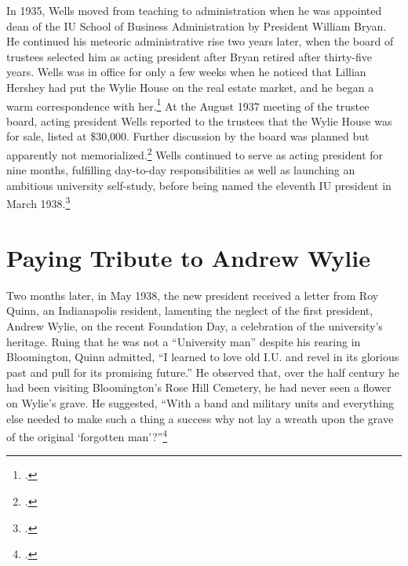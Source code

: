 \documentclass[
  american,
  letterpaper,
]{scrreprt}
\begin{document}
In 1935, Wells moved from teaching to administration when he was
appointed dean of the IU School of Business Administration by President
William Bryan. He continued his meteoric administrative rise two years
later, when the board of trustees selected him as acting president after
Bryan retired after thirty-five years. Wells was in office for only a
few weeks when he noticed that Lillian Hershey had put the Wylie House
on the real estate market, and he began a warm correspondence with
her.\footnote{.} At the August 1937 meeting of the trustee board,
acting president Wells reported to the trustees that the Wylie House was
for sale, listed at \$30,000. Further discussion by the board was
planned but apparently not memorialized.\footnote{.}
Wells continued to serve as acting president for nine months, fulfilling
day-to-day responsibilities as well as launching an ambitious university
self-study, before being named the eleventh IU president in March
1938.\footnote{.}

\section{Paying Tribute to Andrew
Wylie}\label{paying-tribute-to-andrew-wylie}

Two months later, in May 1938, the new president received a letter from
Roy Quinn, an Indianapolis resident, lamenting the neglect of the first
president, Andrew Wylie, on the recent Foundation Day, a celebration of
the university's heritage. Ruing that he was not a ``University man''
despite his rearing in Bloomington, Quinn admitted, ``I learned to love
old I.U. and revel in its glorious past and pull for its promising
future.'' He observed that, over the half century he had been visiting
Bloomington's Rose Hill Cemetery, he had never seen a flower on Wylie's
grave. He suggested, ``With a band and military units and everything
else needed to make such a thing a success why not lay a wreath upon the
grave of the original `forgotten man'?''\footnote{.}
\end{document}
